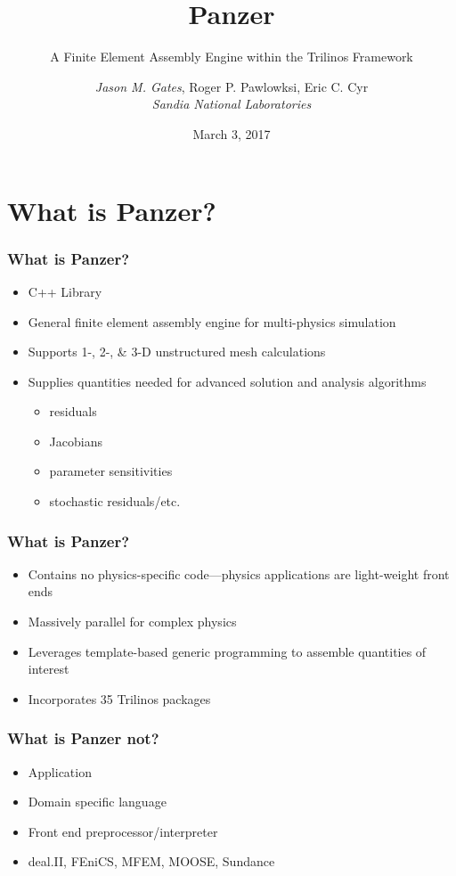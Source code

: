\documentclass{beamer}
\title{Panzer}
\subtitle{A Finite Element Assembly Engine within the Trilinos Framework}
\author[Jason Gates]{\emph{Jason M. Gates}, Roger P. Pawlowksi, Eric C. Cyr\\\footnotesize\emph{Sandia National Laboratories}}
\date{March 3, 2017}
\begin{document}
\begin{frame}
  \titlepage
\end{frame}

\section{What is Panzer?}

  \begin{frame}
    \frametitle{What is Panzer?}
    \begin{itemize}
      \item C++ Library
      \item General finite element assembly engine for multi-physics
            simulation
      \item Supports 1-, 2-, \& 3-D unstructured mesh calculations
      \item Supplies quantities needed for advanced \alert{solution} and
            \alert{analysis} algorithms
            \begin{itemize}
              \item residuals
              \item Jacobians
              \item parameter sensitivities
              \item stochastic residuals/etc.
            \end{itemize}
    \end{itemize}
  \end{frame}

  \begin{frame}
    \frametitle{What is Panzer?}
    \begin{itemize}
      \item Contains no physics-specific code---physics applications are
            light-weight front ends
      \item Massively parallel for complex physics
      \item Leverages template-based generic programming\cite{sacado} to assemble quantities of interest
      \item Incorporates 35 Trilinos packages
    \end{itemize}
  \end{frame}

  \begin{frame}
    \frametitle{What is Panzer \alert{not}?}
    \begin{itemize}
      \item Application
      \item Domain specific language
      \item Front end preprocessor/interpreter
      \item deal.II, FEniCS, MFEM, MOOSE, Sundance
    \end{itemize}
  \end{frame}
\end{document}
